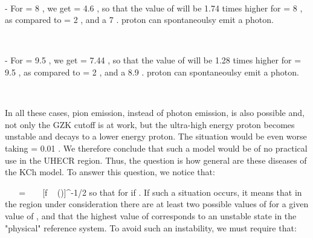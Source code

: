 \documentclass[a4paper,12pt,dvips]{article}
\begin{document}
~ 

- For \myHighlight{$\epsilon $}\coordHE{} = 8 , we get \coordHE{} = 4.6 , so that the value of \coordHE{} will be 1.74 times higher for \myHighlight{$\epsilon $}\coordHE{} = 8 , as compared to \myHighlight{$\epsilon $}\coordHE{} = 2 , and a 7 . \coordHE{}  \coordHE{} proton can spontaneoulsy emit a \coordHE{} photon. 

~ 

- For \myHighlight{$\epsilon $}\coordHE{} = 9.5 , we get \coordHE{} = 7.44 , so that the value of \coordHE{} will be 1.28 times higher for \myHighlight{$\epsilon $}\coordHE{} = 9.5 , as compared to \myHighlight{$\epsilon $}\coordHE{} = 2 , and a 8.9 . \coordHE{}  \coordHE{} proton can spontaneoulsy emit a \coordHE{} photon. 

~ 

In all these cases, pion emission, instead of photon emission, is also possible and, not only the GZK cutoff is at work, but the ultra-high energy proton becomes unstable and decays to a lower energy proton. The situation would be even worse taking \coordHE{} = 0.01 . We therefore conclude that such a model would be of no practical use in the UHECR region. Thus, the question is how general are these diseases of the KCh model. To answer this question, we notice that:

\equation 
\epsilon ~ ~ = ~ ~ [f ~ (\xi )]^{-1/2}
\endequation
\noindent
so that \coordHE{}  \myHighlight{$<$}\coordHE{}  \coordHE{} for \coordHE{}  \myHighlight{$>$}\coordHE{}  \coordHE{} if \coordHE{}  \myHighlight{$>$}\coordHE{}  \coordHE{} . If such a situation occurs, it means that in the region under consideration there are at least two possible values of \coordHE{} for a given value of \coordHE{}, and that the highest value of \coordHE{} corresponds to an unstable state in the "physical" reference system. To avoid such an instability, we must require that:
\end{document}
